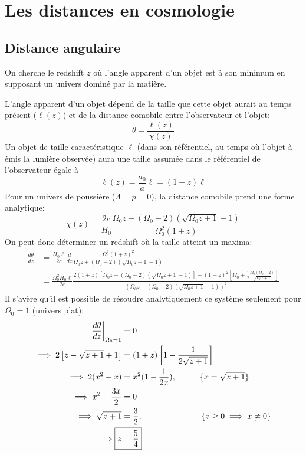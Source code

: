 \documentclass{article}
\numberwithin{equation}{section}
\begin{document}
\section{Les distances en cosmologie}
\subsection{Distance angulaire}
On cherche le redshift $z$ où l'angle apparent d'un objet est à son minimum en supposant 
un univers dominé par la matière.

L'angle apparent d'un objet dépend de la taille que cette objet aurait au 
temps présent ($\ell(z)$) et de la distance 
comobile entre l'observateur et l'objet:
\begin{equation}\label{eq:AngleApparent} 
        \theta = \frac{\ell(z)}{\chi(z)}
\end{equation} 
Un objet de taille caractéristique $\ell$ (dans son référentiel, au temps 
où l'objet à émis la lumière observée) aura une taille assumée dans le référentiel 
de l'observateur égale à
\[
        \ell(z) = \frac{a_0}{a}\ell = (1 + z) \ell
\]
Pour un univers de poussière ($\Lambda = p = 0$), la distance comobile prend une forme 
analytique:
\begin{equation}\label{eq:ComovingDistanceDust} 
        \chi(z) = \frac{2 c}{H_0} \frac{\Omega_0 z + (\Omega_0 - 2)
        (\sqrt{\Omega_0 z + 1} - 1)}{\Omega_0^2(1 + z)}
\end{equation}
On peut donc déterminer un redshift où la taille atteint un maxima:
\begin{align*}
        \frac{d \theta}{d z} &= \frac{H_0 \ell}{2c} \frac{d }{d z} 
                \frac{\Omega_0^2(1 + z)^2}{\Omega_0 z + (\Omega_0 - 2) 
                (\sqrt{\Omega_0 z + 1} - 1)} \\
        &= \frac{\Omega_0^2 H_0 \ell}{2c} 
                \frac{2(1 + z) \left[ \Omega_0 z + (\Omega_0 - 2) 
                (\sqrt{\Omega_0 z + 1} - 1) \right] - 
        (1 + z)^{2} \left[ \Omega_0 + 
        \frac{1}{2}\frac{\Omega_0(\Omega_0 - 2) }{\sqrt{\Omega_0 z  + 1}}\right]}{
        (\Omega_0 z + (\Omega_0 - 2)(\sqrt{\Omega_0 z + 1} - 1))^{2}        
}
\end{align*}
Il s'avère qu'il est possible de résoudre analytiquement 
ce système seulement pour $\Omega_0 = 1$ (univers plat):
\begin{align*}
        \frac{d \theta}{d z}\bigg|_{\Omega_0=1} &= 0 \\
        \implies 2\left[ z -\sqrt{z + 1} + 1\right]
        &= (1 + z) \left[ 1 - \frac{1}{2\sqrt{z + 1}} \right] \\
        \implies 2(x^2 - x) &=  x^2(1 - \frac{1}{2x}), \hspace{1cm} \{x = \sqrt{z + 1} \} \\
        \implies x^2 - \frac{3x}{2} &=  0 \\
        \implies \sqrt{z + 1} &= \frac{3}{2}, \hspace{2.5cm} \{ z \geq 0 \implies x \not= 0 \} \\
        \implies \Aboxed{z &=  \frac{5}{4}}
\end{align*}
\end{document}
